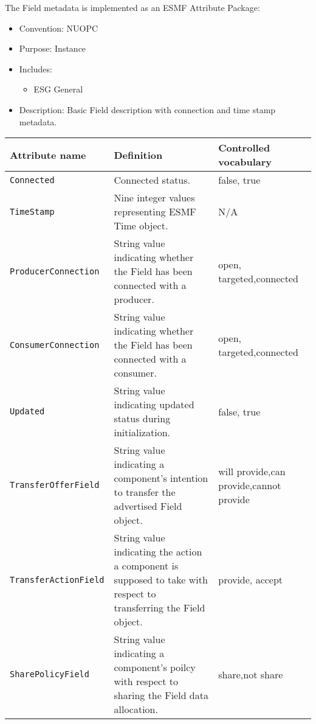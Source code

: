 \label{FieldMeta}
The Field metadata is implemented as an ESMF Attribute Package:

\begin{itemize}
    \item Convention: NUOPC
    \item Purpose: Instance
    \item Includes:
    \begin{itemize}
        \item ESG General
    \end{itemize} 
    \item Description: Basic Field description with connection and time stamp metadata. 
\end{itemize}

\begin{longtable}{|p{}|p{}|p{}|}
     \hline\hline
     {\bf Attribute name} & {\bf Definition} & {\bf Controlled vocabulary}\\
     \hline\hline
     {\tt Connected} & Connected status.& false, true\\ \hline
     {\tt TimeStamp} & Nine integer values representing ESMF Time object.& N/A\\ \hline
     {\tt ProducerConnection} & String value indicating whether the Field has been connected with a producer. & open, targeted,\newline connected\\ \hline
     {\tt ConsumerConnection} & String value indicating whether the Field has been connected with a consumer.& open, targeted,\newline connected\\ \hline
     {\tt Updated} & String value indicating updated status during initialization.& false, true\\ \hline
     {\tt TransferOfferField} & String value indicating a component's intention to transfer the advertised Field object.& will provide,\newline can provide,\newline cannot provide\\ \hline
     {\tt TransferActionField} & String value indicating the action a component is supposed to take with respect to transferring the Field object.& provide, accept\\ \hline
     {\tt SharePolicyField} & String value indicating a component's poilcy with respect to sharing the Field data allocation.& share,\newline not share\\ \hline

\end{longtable}
